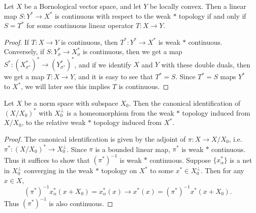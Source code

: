 \begin{theorem}
    Let $X$ be a Bornological vector space, and let $Y$ be locally convex. Then a linear map $S: Y^* \to X^*$ is continuous with respect to the weak $*$ topology if and only if $S = T^*$ for some continuous linear operator $T: X \to Y$.
\end{theorem}
\begin{proof}
    If $T: X \to Y$ is continuous, then $T^*: Y^* \to X^*$ is weak $*$ continuous. Conversely, if $S: Y^*_\sigma \to X^*_\sigma$ is continuous, then we get a map $S^*: (X^*_{\sigma^*})^* \to (Y^*_{\sigma^*})^*$, and if we identify $X$ and $Y$ with these double duals, then we get a map $T: X \to Y$, and it is easy to see that $T^* = S$. Since $T^* = S$ maps $Y^*$ to $X^*$, we will later see this implies $T$ is continuous.
\end{proof}

\begin{corollary}
    Let $X$ be a norm space with subspace $X_0$. Then the canonical identification of $(X/X_0)^*$ with $X_0^\perp$ is a homeomorphism from the weak $*$ topology induced from $X/X_0$, to the relative weak $*$ topology induced from $X^*$.
\end{corollary}
\begin{proof}
    The canonical identification is given by the adjoint of $\pi: X \to X/X_0$, i.e. $\pi^*: (X/X_0)^* \to X_0^\perp$. Since $\pi$ is a bounded linear map, $\pi^*$ is weak $*$ continuous. Thus it suffices to show that $(\pi^*)^{-1}$ is weak $*$ continuous. Suppose $\{ x_\alpha^* \}$ is a net in $X_0^\perp$ converging in the weak $*$ topology on $X^*$ to some $x^* \in X_0^\perp$. Then for any $x \in X$,
    \[ (\pi^*)^{-1} x_\alpha^*(x + X_0) = x_\alpha^*(x) \to x^*(x) = (\pi^*)^{-1} x^* (x + X_0). \]
    Thus $(\pi^*)^{-1}$ is also continuous.
\end{proof}

